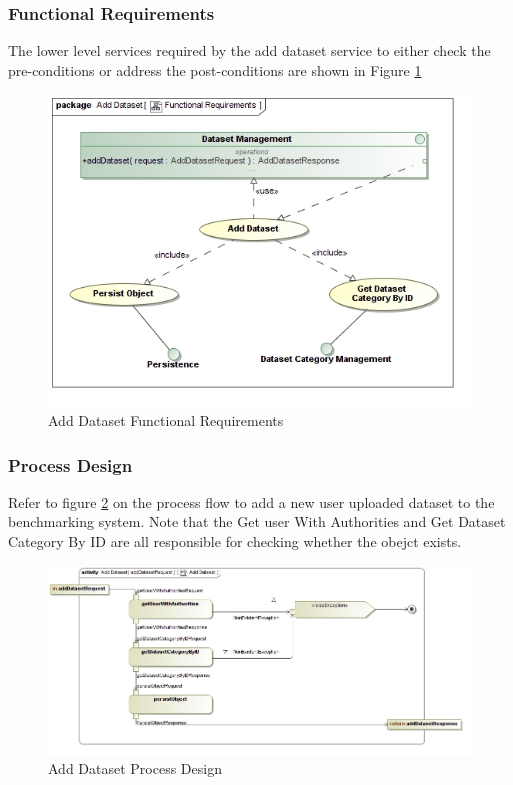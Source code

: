 \subsubsection{Functional Requirements}
The lower level services required by the add dataset service to either check the
pre-conditions or address the post-conditions are shown in Figure \ref{fig:addDatasetFR}
\begin{figure}[H]
  \begin{center}
  \includegraphics[scale=0.38]{../Diagrams and Charts/Repository Management/Add Dataset Functional Requirements.jpg}
  \caption{Add Dataset Functional Requirements}
  \label{fig:addDatasetFR}
  \end{center}
\end{figure}

\subsubsection{Process Design}
Refer to figure \ref{fig:addDatasetProcessDesign} on the process flow to add
a new user uploaded dataset to the benchmarking system. Note that the Get user
With Authorities and Get Dataset Category By ID are all responsible for checking
whether the obejct exists.
\begin{figure}[H]
  \begin{center}
  \includegraphics[scale=0.38]{../Diagrams and Charts/Repository Management/Add Dataset Process Design.jpg}
  \caption{Add Dataset Process Design}
  \label{fig:addDatasetProcessDesign}
  \end{center}
\end{figure}




